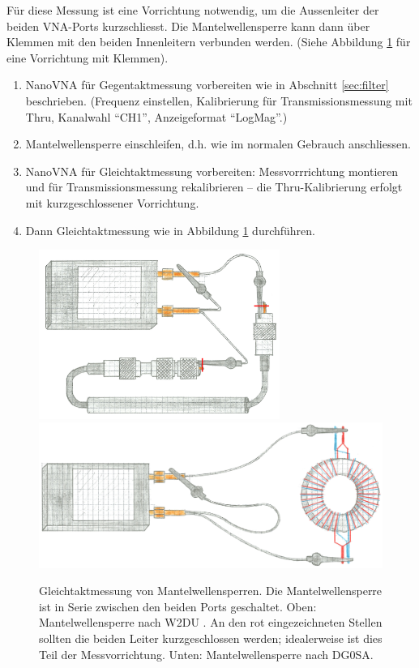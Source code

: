 \documentclass[twoside,a4paper,11pt,halfparskip,DIV=11,notitlepage]{scrartcl}
\begin{document}
Für diese Messung ist eine Vorrichtung notwendig, um die Aussenleiter der
beiden VNA-Ports kurzschliesst. Die Mantelwellensperre kann dann über Klemmen
mit den beiden Innenleitern verbunden werden. (Siehe Abbildung
\ref{fig:illustration_choke} für eine Vorrichtung mit Klemmen).

\begin{enumerate}
    \item NanoVNA für Gegentaktmessung vorbereiten wie in Abschnitt \ref{sec:filter} beschrieben.
        (Frequenz einstellen, Kalibrierung für Transmissionsmessung mit Thru, Kanalwahl ``CH1'',
        Anzeigeformat ``LogMag''.)
    \item Mantelwellensperre einschleifen, d.h. wie im normalen Gebrauch anschliessen.
    \item NanoVNA für Gleichtaktmessung vorbereiten: Messvorrrichtung montieren und für
        Transmissionsmessung rekalibrieren -- die Thru-Kalibrierung erfolgt mit kurzgeschlossener
        Vorrichtung.
    \item Dann Gleichtaktmessung wie in Abbildung \ref{fig:illustration_choke} durchführen.
\end{enumerate}

\begin{figure}
    \includegraphics[width=0.7\textwidth]{figures/illustration_w2du_short.png}
    \includegraphics[width=\textwidth]{figures/illustration_DG0SA.png}
    \caption{Gleichtaktmessung von Mantelwellensperren. Die Mantelwellensperre
        ist in Serie zwischen den beiden Ports geschaltet. Oben: Mantelwellensperre
        nach W2DU \cite{maxwell1983w2du}. An den rot eingezeichneten Stellen sollten die
        beiden Leiter kurzgeschlossen werden; idealerweise ist dies Teil der Messvorrichtung.
        Unten: Mantelwellensperre nach DG0SA.}
    \label{fig:illustration_choke}
\end{figure}
\end{document}
